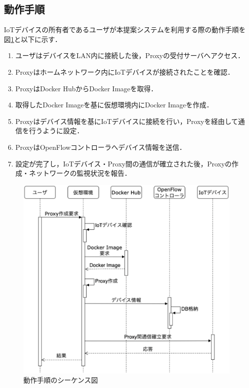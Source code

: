 \documentclass[Japanese]{dicomopapers}
\begin{document}
\subsection{動作手順}
IoTデバイスの所有者であるユーザが本提案システムを利用する際の動作手順を図\ref{fig:seaquence}と以下に示す．
\begin{enumerate}
	\item ユーザはデバイスをLAN内に接続した後，Proxyの受付サーバへアクセス．
	\item Proxyはホームネットワーク内にIoTデバイスが接続されたことを確認．
	\item ProxyはDocker HubからDocker Imageを取得．
	\item 取得したDocker Imageを基に仮想環境内にDocker Imageを作成．
	\item Proxyはデバイス情報を基にIoTデバイスに接続を行い，Proxyを経由して通信を行うように設定．
	\item ProxyはOpenFlowコントローラへデバイス情報を送信．
	\item 設定が完了し，IoTデバイス・Proxy間の通信が確立された後，Proxyの作成・ネットワークの監視状況を報告．
\end{enumerate}


\begin{figure}[!tb]
	\centering
	\includegraphics[width=\linewidth]{img/seaquence.eps}
	\caption{動作手順のシーケンス図}
	\label{fig:seaquence}
\end{figure}
\end{document}
